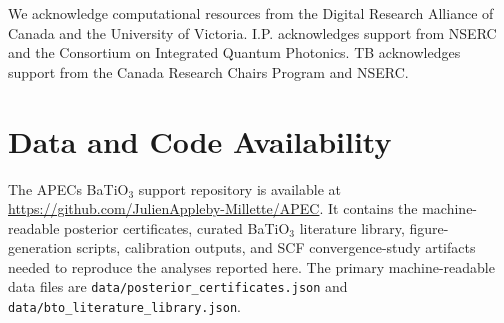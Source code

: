 \documentclass[twocolumn,superscriptaddress,amsmath,amssymb,longbibliography]{revtex4-2}
\begin{document}

\begin{acknowledgments}

We acknowledge computational resources from the Digital Research Alliance of
Canada and the University of Victoria. I.P. acknowledges support from NSERC and the  Consortium on Integrated Quantum Photonics. TB acknowledges support from the Canada Research Chairs Program and NSERC.

\end{acknowledgments}

\section*{Data and Code Availability}

The APECs BaTiO$_3$ support repository is available at
\url{https://github.com/JulienAppleby-Millette/APEC}. It contains the
machine-readable posterior certificates, curated BaTiO$_3$ literature library,
figure-generation scripts, calibration outputs, and SCF convergence-study
artifacts needed to reproduce the analyses reported here. The primary
machine-readable data files are
\texttt{data/posterior\_certificates.json} and
\texttt{data/bto\_literature\_library.json}.


\end{document}
